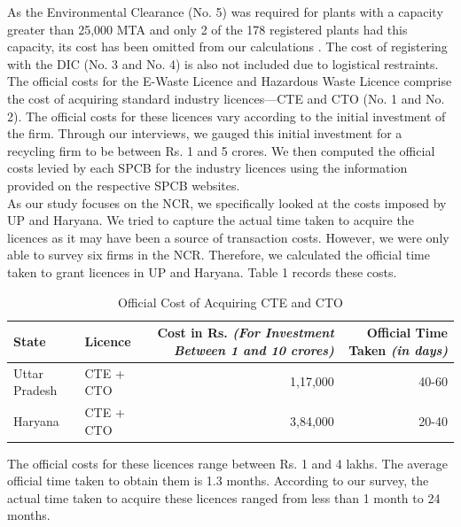 \documentclass[a4paper, 12pt]{article}
\begin{document}
                    As the Environmental Clearance (No. 5) was required for plants with a capacity greater than 25,000 MTA and only 2 of the 178 registered plants had this capacity, its cost has been omitted from our calculations \parencite{cpcbrecyclersreport}. The cost of registering with the DIC (No. 3 and No. 4) is also not included due to logistical restraints.\\
                    
                    The official costs for the E-Waste Licence and Hazardous Waste Licence comprise the cost of acquiring standard industry licences—CTE and CTO (No. 1 and No. 2). The official costs for these licences vary according to the initial investment of the firm. Through our interviews, we gauged this initial investment for a recycling firm to be between Rs. 1 and 5 crores. We then computed the official costs levied by each SPCB for the industry licences using the information provided on the respective SPCB websites.\\ 
                    
                    As our study focuses on the NCR, we specifically looked at the costs imposed by UP and Haryana. We tried to capture the actual time taken to acquire the licences as it may have been a source of transaction costs. However, we were only able to survey six firms in the NCR. Therefore, we calculated the official time taken to grant licences in UP and Haryana. Table 1 records these costs. \\
          
\begin{table}[htpb]
\caption{Official Cost of Acquiring CTE and CTO}
\begin{tabular}{ l  l  r  r }
 \multicolumn{1}{p{7em}}{State} & \multicolumn{1}{p{7em}}{Licence} & \multicolumn{1}{p{11.5em}}{Cost in Rs. \footnotesize\textit{(For Investment Between 1 and 10 crores)}} & \multicolumn{1}{p{8.75em}}{{Official Time Taken} \raggedleft\footnotesize\textit{(in days)}}\\ 

\hline
Uttar Pradesh & CTE + CTO & 1,17,000 & 40-60\\ 
Haryana & CTE + CTO & 3,84,000 & 20-40\\

\end{tabular}
\end{table}
                    
                    The official costs for these licences range between Rs. 1 and 4 lakhs. The average official time taken to obtain them is 1.3 months. According to our survey, the actual time taken to acquire these licences ranged from less than 1 month to 24 months.
                    
\end{document}

